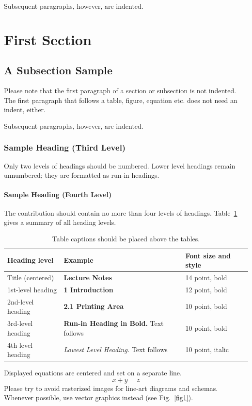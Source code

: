 \documentclass[runningheads]{llncs}
\begin{document}
Subsequent paragraphs, however, are indented.

\section{First Section}
\subsection{A Subsection Sample}
Please note that the first paragraph of a section or subsection is
not indented. The first paragraph that follows a table, figure,
equation etc. does not need an indent, either.

Subsequent paragraphs, however, are indented.

\subsubsection{Sample Heading (Third Level)} Only two levels of
headings should be numbered. Lower level headings remain unnumbered;
they are formatted as run-in headings.

\paragraph{Sample Heading (Fourth Level)}
The contribution should contain no more than four levels of
headings. Table~\ref{tab1} gives a summary of all heading levels.

\begin{table}
\caption{Table captions should be placed above the
tables.}\label{tab1}
\begin{tabular}{|l|l|l|}
\hline
Heading level &  Example & Font size and style\\
\hline
Title (centered) &  {\Large\bfseries Lecture Notes} & 14 point, bold\\
1st-level heading &  {\large\bfseries 1 Introduction} & 12 point, bold\\
2nd-level heading & {\bfseries 2.1 Printing Area} & 10 point, bold\\
3rd-level heading & {\bfseries Run-in Heading in Bold.} Text follows & 10 point, bold\\
4th-level heading & {\itshape Lowest Level Heading.} Text follows & 10 point, italic\\
\hline
\end{tabular}
\end{table}


\noindent Displayed equations are centered and set on a separate
line.
\begin{equation}
x + y = z
\end{equation}
Please try to avoid rasterized images for line-art diagrams and
schemas. Whenever possible, use vector graphics instead (see
Fig.~\ref{fig1}).
\end{document}
